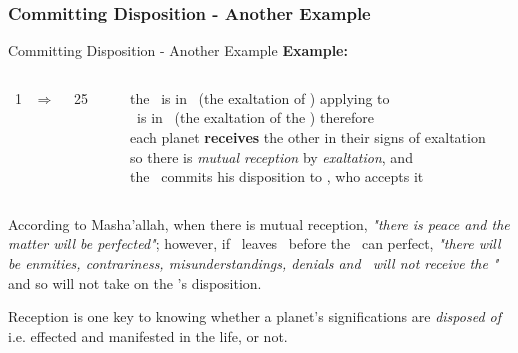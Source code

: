 \subsubsection{Committing Disposition - Another Example}
\begin{frame}[t]{Committing Disposition - Another Example}
\textbf{Example:}\footnotemark[1]
\begin{columns}[T, onlytextwidth]
\Sun\ 1 \Libra\ $\Rightarrow$ \Opposition\ \Saturn\ 25 \Aries

\rule{.1mm}{.25\textheight}

the \Sun\ is in \Libra\ (the exaltation of \Saturn) applying to \Opposition\ \Saturn \\
\Saturn\ is in \Aries\ (the exaltation of the \Sun) therefore \\
each planet \textbf{receives} the other in their signs of exaltation \\
so there is \textsl{mutual reception} by \textsl{exaltation}, and \\
the \Sun\ commits his disposition to \Saturn, who accepts it
\end{columns}
\vspace{0.25cm}
According to Masha'allah, when there is mutual reception, \textsl{"there is peace and the matter will be perfected"}; however, if \Saturn\ leaves \Aries\ before the \Opposition\ can perfect, \textsl{"there will be enmities, contrariness, misunderstandings, denials and \Saturn\ will not receive the \Sun"} and so will not take on the \Sun's disposition.

\begin{block}{}
Reception is one key to knowing whether a planet's significations are \textsl{disposed of} i.e. effected and manifested in the life, or not.
\end{block}

\end{frame}

